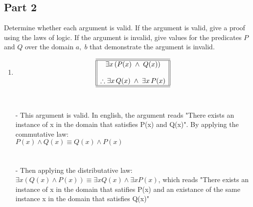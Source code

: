 \documentclass{amsart}
\theoremstyle{definition}
\theoremstyle{Exercise}
\theoremstyle{remark}
\theoremstyle{rule}
\numberwithin{equation}{section}
\begin{document}
 \subsection*{Part 2}
Determine whether each argument is valid. If the argument is valid, give a proof using the laws of logic. If the argument is invalid, give values for the predicates $P$ and $Q$ over 
the domain ${a,\; b}$ that demonstrate the argument is invalid.\\
 \begin{enumerate}[label=(\alph*)]
\item \[
\begin{array}{||c||}
\hline \hline
\exists x\, (P(x)\; \land \;Q(x) )\\
\\
\therefore \exists x\, Q(x)\; \land\; \exists x \,P(x) \\
\hline \hline
\end{array}
\]\\\\
 - This argument is valid. In english, the argument reads "There exists an instance of x in the domain that satisfies P(x) and Q(x)". By applying the commutative law:\\ $P(x) \land Q(x) \equiv Q(x) \land P(x)$\\\\
 \vspace*{0.5in}\\
 - Then applying the distributative law:\\ $\exists x (Q(x) \land P(x)) \equiv \exists xQ(x) \land \exists xP(x)$, which reads "There exists an instance of x in the domain that satifies P(x) and an existance of the same instance x in the domain that satisfies Q(x)"
 \\\\



\end{enumerate}
\end{document}
